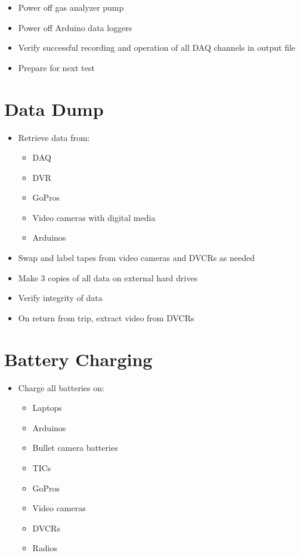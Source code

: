 \documentclass[11pt,oneside]{book}
\begin{document}
\begin{itemize}
\item Power off gas analyzer pump

\item Power off Arduino data loggers

\item Verify successful recording and operation of all DAQ channels in output file

\item Prepare for next test
\end{itemize}

\section{Data Dump}

\begin{itemize}
\item Retrieve data from:
    \begin{itemize}
    \item DAQ
    \item DVR
    \item GoPros
    \item Video cameras with digital media
    \item Arduinos
    \end{itemize}

\item Swap and label tapes from video cameras and DVCRs as needed

\item Make 3 copies of all data on external hard drives

\item Verify integrity of data

\item On return from trip, extract video from DVCRs
\end{itemize}

\section{Battery Charging}

\begin{itemize}
\item Charge all batteries on:
    \begin{itemize}
    \item Laptops
    \item Arduinos
    \item Bullet camera batteries
    \item TICs
    \item GoPros
    \item Video cameras
    \item DVCRs
    \item Radios
    \end{itemize}
\end{itemize}
\end{document}
